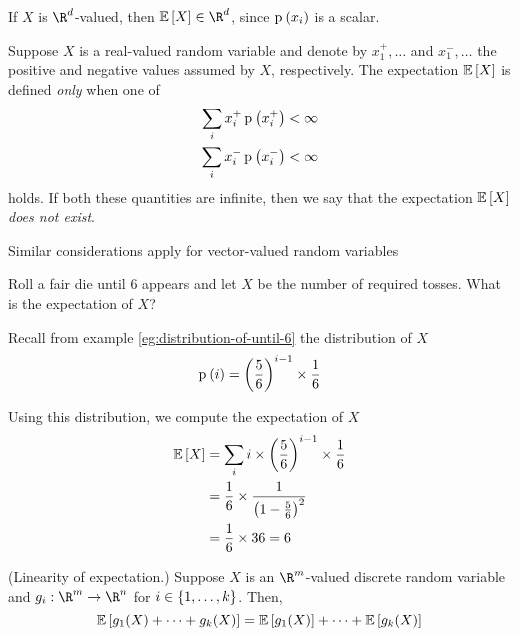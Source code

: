 \documentclass[11pt]{article}
\begin{document}
\begin{rem}
    If $X$ is $\R^d$-valued, then $\E{X} \in \R^d$, since $\p{x_i}$ is a
    scalar.
\end{rem}

\begin{defn}
    Suppose $X$ is a real-valued random variable and denote by $x_1^+,\ldots$
    and $x_1^-,\ldots$ the positive and negative values assumed by $X$,
    respectively.
    The expectation $\operatorname{\mathbb{E}}{\left[X\right]}$ is defined \emph{only} when one of
    \begin{align*}
        \sum_i x_i^+ \p{x_i^+} &< \infty \\
        \sum_i x_i^- \p{x_i^-} &< \infty
    \end{align*}
    holds.
    If both these quantities are infinite, then we say that the expectation
    $\operatorname{\mathbb{E}}{\left[X\right]}$ \emph{does not exist}.

    Similar considerations apply for vector-valued random variables
\end{defn}

\begin{eg}
    Roll a fair die until $6$ appears and let $X$ be the number of required
    tosses. What is the expectation of $X$?
\end{eg}

\begin{solution}
    Recall from example \ref{eg:distribution-of-until-6} the
    distribution of $X$
    \begin{equation*}
        \p{i} = \parens{\frac{5}{6}}^{i-1} \times \frac{1}{6}
    \end{equation*}

    Using this distribution, we compute the expectation of $X$
    \begin{align*}
        \operatorname{\mathbb{E}}{\left[X\right]}
            &= \sum_{i} i \times \left(\frac{5}{6}\right)^{i-1} \times \frac{1}{6} \\
            &= \frac{1}{6} \times \frac{1}{\left(1 - \frac{5}{6}\right)^2} \\
            &= \frac{1}{6} \times 36 = 6
    \end{align*}
\end{solution}

\begin{thm}{(Linearity of expectation.)}
    Suppose $X$ is an $\R^m$-valued discrete random variable
    and $g_i : \R^m \to \R^n$ for $i \in \range{k}$. Then,
    \begin{equation*}
        \operatorname{\mathbb{E}}{\left[g_1(X) + \cdots + g_k(X)\right]}
        = \operatorname{\mathbb{E}}{\left[g_1(X)\right]} + \cdots + \operatorname{\mathbb{E}}{\left[g_k(X)\right]}
    \end{equation*}
\end{thm}
\end{document}

